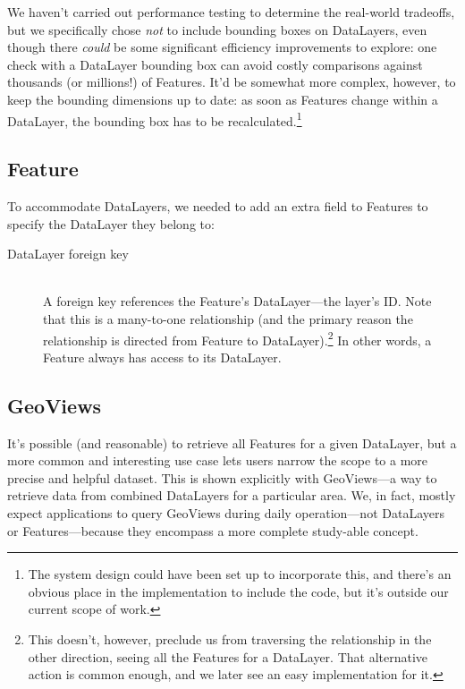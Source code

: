  We haven't carried out performance testing to determine the real-world tradeoffs, but we specifically chose \textit{not} to include bounding boxes on DataLayers, even though there \textit{could} be some significant efficiency improvements to explore: one check with a DataLayer bounding box can avoid costly comparisons against thousands (or millions!) of Features. It'd be somewhat more complex, however, to keep the bounding dimensions up to date: as soon as Features change within a DataLayer, the bounding box has to be recalculated.\footnote{The system design could have been set up to incorporate this, and there's an obvious place in the implementation to include the code, but it's outside our current scope of work.}

\subsection{Feature}
To accommodate DataLayers, we needed to add an extra field to Features to specify the DataLayer they belong to:

\begin{description}

\item[DataLayer foreign key] \hfill \\
A foreign key references the Feature's DataLayer---the layer's ID. Note that this is a many-to-one relationship (and the primary reason the relationship is directed from Feature to DataLayer).\footnote{This doesn't, however, preclude us from traversing the relationship in the other direction, seeing all the Features for a DataLayer. That alternative action is common enough, and we later see an easy implementation for it.} In other words, a Feature always has access to its DataLayer.

\end{description}


\subsection{GeoViews}

It's possible (and reasonable) to retrieve all Features for a given DataLayer, but a more common and interesting use case lets users narrow the scope to a more precise and helpful dataset. This is shown explicitly with GeoViews---a way to retrieve data from combined DataLayers for a particular area. We, in fact, mostly expect applications to query GeoViews during daily operation---not DataLayers or Features---because they encompass a more complete study-able concept.

